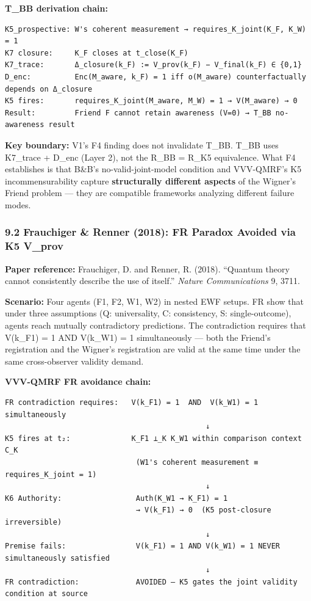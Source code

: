 \documentclass[
  11pt,
]{article}
\begin{document}
\textbf{T\_BB derivation chain:}

\begin{verbatim}
K5_prospective: W's coherent measurement → requires_K_joint(K_F, K_W) = 1
K7 closure:     K_F closes at t_close(K_F)
K7_trace:       Δ_closure(k_F) := V_prov(k_F) − V_final(k_F) ∈ {0,1}
D_enc:          Enc(M_aware, k_F) = 1 iff o(M_aware) counterfactually depends on Δ_closure
K5 fires:       requires_K_joint(M_aware, M_W) = 1 → V(M_aware) → 0
Result:         Friend F cannot retain awareness (V=0) → T_BB no-awareness result
\end{verbatim}

\textbf{Key boundary:} V1's F4 finding does not invalidate T\_BB. T\_BB
uses K7\_trace + D\_enc (Layer 2), not the R\_BB = R\_K5 equivalence.
What F4 establishes is that B\&B's no-valid-joint-model condition and
VVV-QMRF's K5 incommensurability capture \textbf{structurally different
aspects} of the Wigner's Friend problem --- they are compatible
frameworks analyzing different failure modes.

\subsubsection{9.2 Frauchiger \& Renner (2018): FR Paradox Avoided via
K5
V\_prov}\label{frauchiger-renner-2018-fr-paradox-avoided-via-k5-v_prov}

\textbf{Paper reference:} Frauchiger, D. and Renner, R. (2018).
``Quantum theory cannot consistently describe the use of itself.''
\emph{Nature Communications} 9, 3711.

\textbf{Scenario:} Four agents (F1, F2, W1, W2) in nested EWF setups. FR
show that under three assumptions (Q: universality, C: consistency, S:
single-outcome), agents reach mutually contradictory predictions. The
contradiction requires that V(k\_F1) = 1 AND V(k\_W1) = 1 simultaneously
--- both the Friend's registration and the Wigner's registration are
valid at the same time under the same cross-observer validity demand.

\textbf{VVV-QMRF FR avoidance chain:}

\begin{verbatim}
FR contradiction requires:   V(k_F1) = 1  AND  V(k_W1) = 1  simultaneously
                                              ↓
K5 fires at t₂:              K_F1 ⊥_K K_W1 within comparison context C_K
                              (W1's coherent measurement ≡ requires_K_joint = 1)
                                              ↓
K6 Authority:                 Auth(K_W1 → K_F1) = 1
                              → V(k_F1) → 0  (K5 post-closure irreversible)
                                              ↓
Premise fails:                V(k_F1) = 1 AND V(k_W1) = 1 NEVER simultaneously satisfied
                                              ↓
FR contradiction:             AVOIDED — K5 gates the joint validity condition at source
\end{verbatim}
\end{document}

